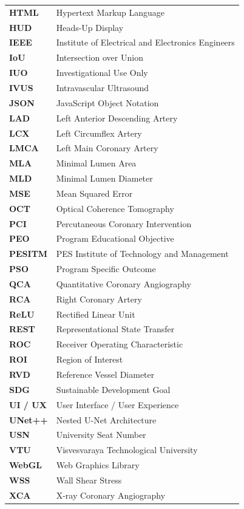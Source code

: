 \begin{longtable}{ll}
\textbf{HTML} & Hypertext Markup Language \\
\textbf{HUD} & Heads-Up Display \\
\textbf{IEEE} & Institute of Electrical and Electronics Engineers \\
\textbf{IoU} & Intersection over Union \\
\textbf{IUO} & Investigational Use Only \\
\textbf{IVUS} & Intravascular Ultrasound \\
\textbf{JSON} & JavaScript Object Notation \\
\textbf{LAD} & Left Anterior Descending Artery \\
\textbf{LCX} & Left Circumflex Artery \\
\textbf{LMCA} & Left Main Coronary Artery \\
\textbf{MLA} & Minimal Lumen Area \\
\textbf{MLD} & Minimal Lumen Diameter \\
\textbf{MSE} & Mean Squared Error \\
\textbf{OCT} & Optical Coherence Tomography \\
\textbf{PCI} & Percutaneous Coronary Intervention \\
\textbf{PEO} & Program Educational Objective \\
\textbf{PESITM} & PES Institute of Technology and Management \\
\textbf{PSO} & Program Specific Outcome \\
\textbf{QCA} & Quantitative Coronary Angiography \\
\textbf{RCA} & Right Coronary Artery \\
\textbf{ReLU} & Rectified Linear Unit \\
\textbf{REST} & Representational State Transfer \\
\textbf{ROC} & Receiver Operating Characteristic \\
\textbf{ROI} & Region of Interest \\
\textbf{RVD} & Reference Vessel Diameter \\
\textbf{SDG} & Sustainable Development Goal \\
\textbf{UI / UX} & User Interface / User Experience \\
\textbf{UNet++} & Nested U-Net Architecture \\
\textbf{USN} & University Seat Number \\
\textbf{VTU} & Visvesvaraya Technological University \\
\textbf{WebGL} & Web Graphics Library \\
\textbf{WSS} & Wall Shear Stress \\
\textbf{XCA} & X-ray Coronary Angiography \\
\end{longtable}
